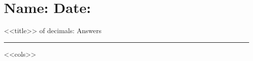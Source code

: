 \documentclass[leqno, 12pt]{article}
\def \HeadingAnswers {\section*{\Large Name: \underline{\hspace{8cm}} \hfill Date: \underline{\hspace{3cm}}} \vspace{-3mm}
{<<title>> of decimals: Answers} \vspace{1pt}\hrule}
\begin{document}
    \HeadingAnswers
    \vspace{-5mm}
    \begin{multicols}{3}
        <<cols>>
    \end{multicols}
\end{document}
